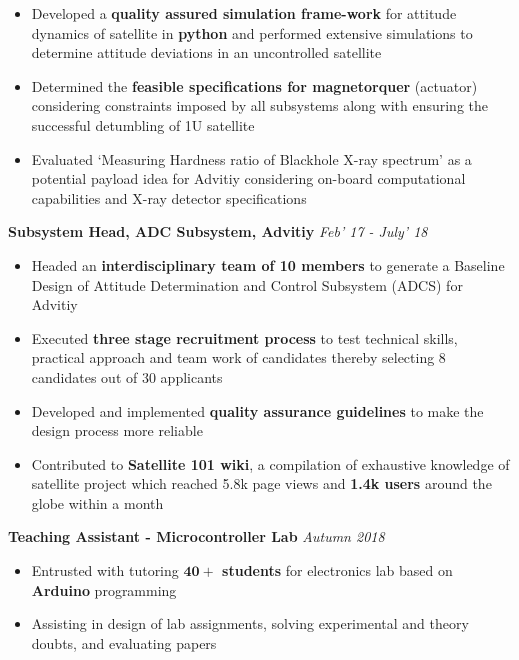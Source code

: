 \documentclass[10pt]{article}%
\newcommand{\xfilll}[2][1ex]{
\dimen0=#2\advance\dimen0 by #1
\leaders\hrule height \dimen0 depth -#1\hfill}
\begin{document}
{\begin{itemize}
    \setlength\itemsep{0.01em}
    \item Developed a \textbf{quality assured simulation frame-work} for attitude dynamics of satellite in \textbf{python} and performed
extensive simulations to determine attitude deviations in an uncontrolled satellite
    \item Determined the \textbf{feasible specifications for magnetorquer} (actuator) considering constraints imposed by all subsystems along with ensuring the successful detumbling of 1U satellite 
    \item Evaluated `Measuring Hardness ratio of Blackhole X-ray spectrum' as a potential payload idea for Advitiy considering on-board computational capabilities and X-ray detector specifications
\end{itemize}
{\flushleft \bf \large{Subsystem Head, ADC Subsystem, Advitiy}}  \hfill \textit{Feb' 17 - July' 18} \\
\begin{itemize}
\vspace{-4mm}
\setlength\itemsep{0.01em}
    \item Headed an \textbf{interdisciplinary team of 10 members} to generate a Baseline Design of Attitude Determination and Control Subsystem (ADCS) for Advitiy%
    \item Executed \textbf{three stage recruitment process} to test technical skills, practical approach and team work of candidates thereby selecting 8 candidates out of 30 applicants%
    \item Developed and implemented \textbf{quality assurance guidelines} to make the design process more reliable 
    \item Contributed to \textbf{Satellite 101 wiki}, a compilation of exhaustive knowledge of satellite project which reached 5.8k
    page views and \textbf{1.4k users} around the globe within a month%

\end{itemize}
{\flushleft \bf \large{Teaching Assistant - Microcontroller Lab}}  \hfill\textit{Autumn 2018} \\
\begin{itemize}
\vspace{-4mm}
\setlength\itemsep{0.01em}
    \item Entrusted with tutoring \textbf{$\mathbf{40+}$ students} for electronics lab based on \textbf{Arduino} programming 
    \item Assisting in design of lab assignments, solving experimental and theory doubts, and evaluating papers
    

\end{itemize}}
\end{document}
